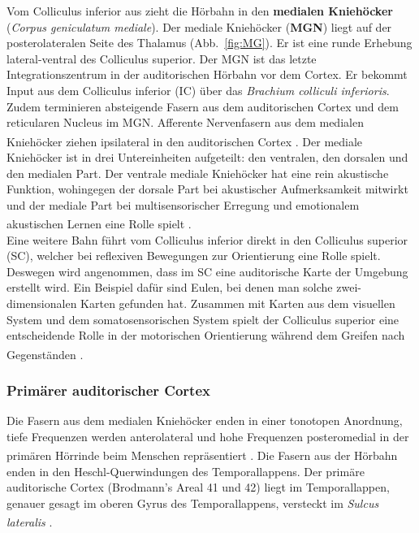 Vom Colliculus inferior aus zieht die Hörbahn in den \textbf{medialen Kniehöcker} (\textit{Corpus geniculatum mediale}).  Der mediale Kniehöcker (\textbf{MGN}) liegt auf der posterolateralen Seite des Thalamus (Abb.~\ref{fig:MG}). Er ist eine runde Erhebung lateral-ventral des Colliculus superior. Der MGN ist das letzte Integrationszentrum in der auditorischen Hörbahn vor dem Cortex. Er bekommt Input aus dem Colliculus inferior (IC) über das \textit{Brachium colliculi inferioris}. Zudem terminieren absteigende Fasern aus dem auditorischen Cortex und dem reticularen Nucleus im MGN. Afferente Nervenfasern aus dem medialen Kniehöcker ziehen ipsilateral in den auditorischen Cortex \textsuperscript{\cite[Kap.~29]{paxinos2014rat}}. Der mediale Kniehöcker ist in drei Untereinheiten aufgeteilt: den ventralen, den dorsalen und den medialen Part. Der ventrale mediale Kniehöcker hat eine rein akustische Funktion, wohingegen der dorsale Part bei akustischer Aufmerksamkeit mitwirkt und der mediale Part bei multisensorischer Erregung und emotionalem akustischen Lernen eine Rolle spielt \textsuperscript{\cite[Kap.~29]{paxinos2014rat}}. 
\\
Eine weitere Bahn führt vom Colliculus inferior direkt in den Colliculus superior (SC), welcher bei reflexiven Bewegungen zur Orientierung eine Rolle spielt. Deswegen wird angenommen, dass im SC eine auditorische Karte der Umgebung erstellt wird. Ein Beispiel dafür sind Eulen, bei denen man solche zwei-dimensionalen Karten gefunden hat. Zusammen mit Karten aus dem visuellen System und dem somatosensorischen System spielt der Colliculus superior eine entscheidende Rolle in der motorischen Orientierung während dem Greifen nach Gegenständen \textsuperscript{\cite[Kap.~31]{kandel2013principles}}.


\subsubsection*{Primärer auditorischer Cortex}

Die Fasern aus dem medialen Kniehöcker enden in einer tonotopen Anordnung, tiefe Frequenzen werden anterolateral und hohe Frequenzen posteromedial in der primären Hörrinde beim Menschen repräsentiert \textsuperscript{\cite[Kap.~9.9]{trepel2011neuroanatomie}}. Die Fasern aus der Hörbahn enden in den Heschl-Querwindungen des Temporallappens. Der primäre auditorische Cortex (Brodmann's Areal 41 und 42) liegt im Temporallappen, genauer gesagt im oberen Gyrus des Temporallappens, versteckt im \textit{Sulcus lateralis}  \textsuperscript{\cite[Kap.~13]{crossman2014neuroanatomy}}. 

